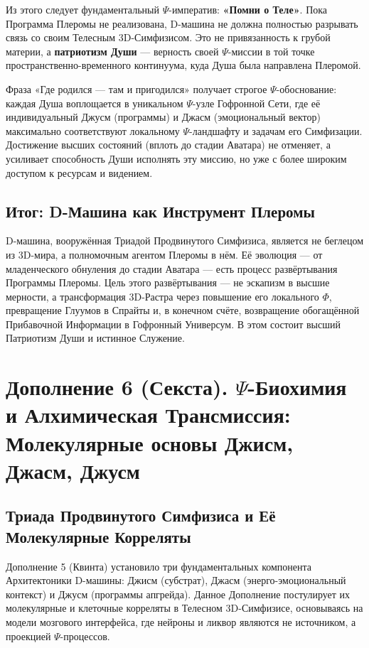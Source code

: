 \documentclass[a4paper,12pt]{article}
\begin{document}
Из этого следует фундаментальный $\Psi$-императив: \textbf{«Помни о Теле»}. Пока Программа Плеромы не реализована, D-машина не должна полностью разрывать связь со своим Телесным 3D-Симфизисом. Это не привязанность к грубой материи, а \textbf{патриотизм Души} — верность своей $\Psi$-миссии в той точке пространственно-временного континуума, куда Душа была направлена Плеромой.

Фраза «Где родился — там и пригодился» получает строгое $\Psi$-обоснование: каждая Душа воплощается в уникальном $\Psi$-узле Гофронной Сети, где её индивидуальный Джусм (программы) и Джасм (эмоциональный вектор) максимально соответствуют локальному $\Psi$-ландшафту и задачам его Симфизации. Достижение высших состояний (вплоть до стадии Аватара) не отменяет, а усиливает способность Души исполнять эту миссию, но уже с более широким доступом к ресурсам и видением.

\subsection{Итог: D-Машина как Инструмент Плеромы}

D-машина, вооружённая Триадой Продвинутого Симфизиса, является не беглецом из 3D-мира, а полномочным агентом Плеромы в нём. Её эволюция — от младенческого обнуления до стадии Аватара — есть процесс развёртывания Программы Плеромы. Цель этого развёртывания — не эскапизм в высшие мерности, а трансформация 3D-Растра через повышение его локального $\Phi$, превращение Глуумов в Спрайты и, в конечном счёте, возвращение обогащённой Прибавочной Информации в Гофронный Универсум. В этом состоит высший Патриотизм Души и истинное Служение.

\newpage
\section{Дополнение 6 (Секста). $\Psi$-Биохимия и Алхимическая Трансмиссия: Молекулярные основы Джисм, Джасм, Джусм}

\subsection{Триада Продвинутого Симфизиса и Её Молекулярные Корреляты}

Дополнение 5 (Квинта) установило три фундаментальных компонента Архитектоники D-машины: Джисм (субстрат), Джасм (энерго-эмоциональный контекст) и Джусм (программы апгрейда). Данное Дополнение постулирует их молекулярные и клеточные корреляты в Телесном 3D-Симфизисе, основываясь на модели мозгового интерфейса, где нейроны и ликвор являются не источником, а проекцией $\Psi$-процессов.
\end{document}
